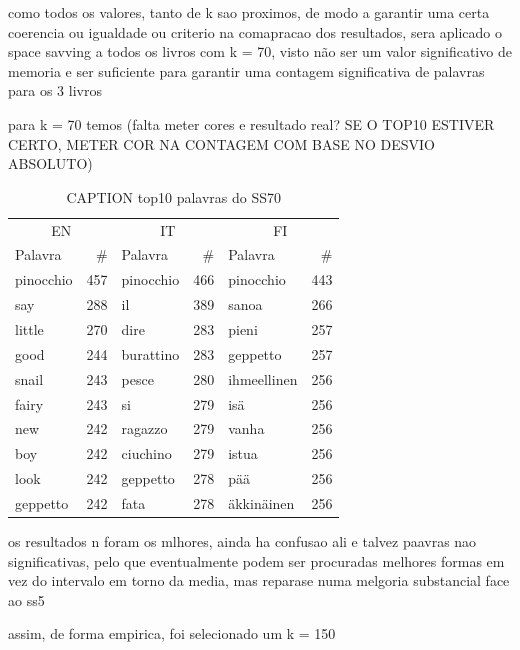 \documentclass[mirror, portugues]{revdetua}
\begin{document}
como todos os valores, tanto de k sao proximos, de modo a garantir uma certa coerencia ou igualdade ou criterio na comapracao dos resultados, sera aplicado o space savving a todos os livros com k = 70, visto não ser um valor significativo de memoria e ser suficiente para garantir uma contagem significativa de palavras para os 3 livros

para k = 70 temos (falta meter cores e resultado real? SE O TOP10 ESTIVER CERTO, METER COR NA CONTAGEM COM BASE NO DESVIO ABSOLUTO)

\begin{table}[H]
\centering
\caption{CAPTION top10 palavras do SS70}
\label{table:top10_ss70}
\begin{tabular}{lr|lr|lr}
\toprule
\multicolumn{2}{c}{EN} & \multicolumn{2}{c}{IT} & \multicolumn{2}{c}{FI} \\
Palavra & \# & Palavra & \# & Palavra & \# \\
\midrule
pinocchio & 457 & pinocchio & 466 & pinocchio & 443 \\
say & 288 & il & 389 & sanoa & 266 \\
little & 270 & dire & 283 & pieni & 257 \\
good & 244 & burattino & 283 & geppetto & 257 \\
snail & 243 & pesce & 280 & ihmeellinen & 256 \\
fairy & 243 & si & 279 & isä & 256 \\
new & 242 & ragazzo & 279 & vanha & 256 \\
boy & 242 & ciuchino & 279 & istua & 256 \\
look & 242 & geppetto & 278 & pää & 256 \\
geppetto & 242 & fata & 278 & äkkinäinen & 256 \\
\bottomrule
\end{tabular}
\end{table}

os resultados n foram os mlhores, ainda ha confusao ali e talvez paavras nao significativas, pelo que eventualmente podem ser procuradas melhores formas em vez do intervalo em torno da media, mas reparase numa melgoria substancial face ao ss5

assim, de forma empirica, foi selecionado um k = 150
\end{document}
